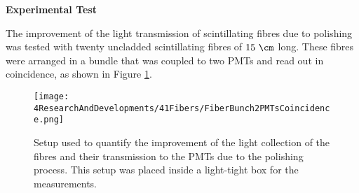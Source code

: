 \textbf{Experimental Test}

The improvement of the light transmission of scintillating fibres due to polishing was tested with twenty uncladded scintillating fibres of $15~\cm$ long. These fibres were arranged in a bundle that was coupled to two PMTs and read out in coincidence, as shown in Figure \ref{fig:BunchWith2PMTsCoincidence}.

\begin{figure}[]
\centering
\texttt{[image: 4ResearchAndDevelopments/41Fibers/FiberBunch2PMTsCoincidence.png]}
\caption{Setup used to quantify the improvement of the light collection of the fibres and their transmission to the PMTs due to the polishing process. This setup was placed inside a light-tight box for the measurements.\label{fig:BunchWith2PMTsCoincidence}}
\end{figure}

